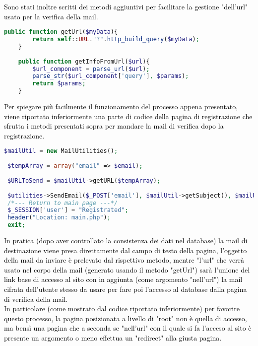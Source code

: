   \textcolor{black}{Sono stati inoltre scritti dei metodi aggiuntivi per facilitare la gestione  "dell'url" usato per la verifica della mail.}\\
  
 \begin{lstlisting}[language=php]
   	public function getUrl($myData){
   		return self::URL."?".http_build_query($myData);
   	}
   	
   	public function getInfoFromUrl($url){
   		$url_component = parse_url($url);
   		parse_str($url_component['query'], $params);
   		return $params;
   	}
 \end{lstlisting}
 
 \textcolor{black}{Per spiegare più facilmente il funzionamento del processo appena presentato,  viene riportato inferiormente una parte di codice della pagina di registrazione che sfrutta i metodi presentati sopra per mandare la mail di verifica dopo la registrazione.}\\ 
 
 \begin{lstlisting}[language=php]
 $mailUtil = new MailUtilities();
 
 $tempArray = array("email" => $email);
 
 $URLToSend = $mailUtil->getURL($tempArray);
 
 $utilities->SendEmail($_POST['email'], $mailUtil->getSubject(), $mailUtil->getBody($URLToSend), $mailUtil->getAlternativeBody($URLToSend));
 /*--- Return to main page ---*/
 $_SESSION['user'] = "Registrated";
 header("Location: main.php");
 exit;
  \end{lstlisting}
  
 \textcolor{black}{ In pratica (dopo aver controllato la consistenza dei dati nel database) la mail di destinazione viene presa direttamente dal campo di testo della pagina, l'oggetto della mail da inviare è prelevato dal rispettivo metodo, mentre "l'url" che verrà usato nel corpo della mail (generato usando il metodo "getUrl") sarà l'unione del link base di accesso al sito con in aggiunta (come argomento "nell'url") la mail cifrata dell'utente stesso da usare per fare poi l'accesso al database dalla pagina di verifica della mail.\\
 In particolare (come mostrato dal codice riportato inferiormente) per favorire questo processo, la pagina posizionata a livello di "root" non è quella di accesso, ma bensì una pagina che a seconda se "nell'url" con il quale si fa l'acceso al sito è presente un argomento o meno effettua un "redirect" alla giusta pagina.}\\
  
